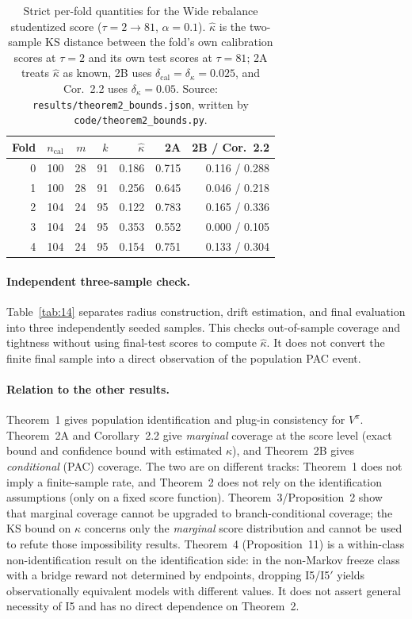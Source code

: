 \begin{table}[t]
\centering
\small
\caption{Strict per-fold quantities for the Wide rebalance studentized score
($\tau=2\to81$, $\alpha=0.1$). $\hat\kappa$ is the two-sample KS distance between
the fold's own calibration scores at $\tau=2$ and its own test scores at
$\tau=81$; 2A treats $\hat\kappa$ as known, 2B uses
$\delta_{\mathrm{cal}}=\delta_\kappa=0.025$, and Cor.~2.2 uses $\delta_\kappa=0.05$.
Source: \texttt{results/theorem2\_bounds.json}, written by
\texttt{code/theorem2\_bounds.py}.}
\label{tab:a3-strict}
\begin{tabular}{@{}rrrrrrr@{}}
\toprule
Fold & $n_{\mathrm{cal}}$ & $m$ & $k$ & $\hat\kappa$ & 2A & 2B / Cor.~2.2 \\
\midrule
0 & 100 & 28 & 91 & 0.186 & 0.715 & 0.116 / 0.288 \\
1 & 100 & 28 & 91 & 0.256 & 0.645 & 0.046 / 0.218 \\
2 & 104 & 24 & 95 & 0.122 & 0.783 & 0.165 / 0.336 \\
3 & 104 & 24 & 95 & 0.353 & 0.552 & 0.000 / 0.105 \\
4 & 104 & 24 & 95 & 0.154 & 0.751 & 0.133 / 0.304 \\
\bottomrule
\end{tabular}
\end{table}

\paragraph{Independent three-sample check.} Table~\ref{tab:14} separates radius
construction, drift estimation, and final evaluation into three independently
seeded samples. This checks out-of-sample coverage and tightness without using
final-test scores to compute $\hat\kappa$. It does not convert the finite final
sample into a direct observation of the population PAC event.


\paragraph{Relation to the other results.}
Theorem~1 gives population identification and plug-in consistency for $V^\pi$.
Theorem~2A and Corollary~2.2 give \emph{marginal} coverage at the score level
(exact bound and confidence bound with estimated $\kappa$), and Theorem~2B gives
\emph{conditional} (PAC) coverage. The two are on different tracks: Theorem~1 does
not imply a finite-sample rate, and Theorem~2 does not rely on the identification
assumptions (only on a fixed score function). Theorem~3/Proposition~2 show that
marginal coverage cannot be upgraded to branch-conditional coverage; the KS bound
on $\kappa$ concerns only the \emph{marginal} score distribution and cannot be used
to refute those impossibility results. Theorem~4 (Proposition~11) is a
within-class non-identification result on the identification side: in the
non-Markov freeze class with a bridge reward not determined by endpoints,
dropping I5/I5$'$ yields observationally equivalent models with different
values. It does not assert general necessity of I5 and has no direct
dependence on Theorem~2.

\let\theHequation\aIIItheHequation
